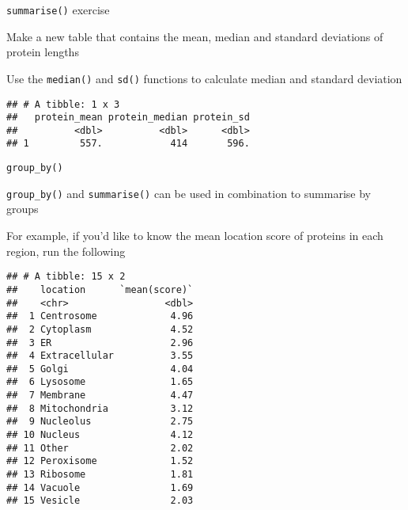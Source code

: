 \documentclass[ignorenonframetext,]{beamer}
\newenvironment{Shaded}{\begin{snugshade}}{\end{snugshade}}
\newcommand{\DataTypeTok}[1]{\textcolor[rgb]{0.13,0.29,0.53}{#1}}
\newcommand{\KeywordTok}[1]{\textcolor[rgb]{0.13,0.29,0.53}{\textbf{#1}}}
\newcommand{\NormalTok}[1]{#1}
\newcommand{\OperatorTok}[1]{\textcolor[rgb]{0.81,0.36,0.00}{\textbf{#1}}}
\newcommand{\StringTok}[1]{\textcolor[rgb]{0.31,0.60,0.02}{#1}}
\begin{document}
\begin{frame}[fragile]{\texttt{summarise()} exercise}
\protect\hypertarget{summarise-exercise}{}

Make a new table that contains the mean, median and standard deviations
of protein lengths

Use the \texttt{median()} and \texttt{sd()} functions to calculate
median and standard deviation

\begin{Shaded}
\end{Shaded}

\begin{verbatim}
## # A tibble: 1 x 3
##   protein_mean protein_median protein_sd
##          <dbl>          <dbl>      <dbl>
## 1         557.            414       596.
\end{verbatim}

\end{frame}

\begin{frame}[fragile]{\texttt{group\_by()}}
\protect\hypertarget{group_by}{}

\texttt{group\_by()} and \texttt{summarise()} can be used in combination
to summarise by groups

For example, if you'd like to know the mean location score of proteins
in each region, run the following

\begin{Shaded}
\end{Shaded}

\begin{verbatim}
## # A tibble: 15 x 2
##    location      `mean(score)`
##    <chr>                 <dbl>
##  1 Centrosome             4.96
##  2 Cytoplasm              4.52
##  3 ER                     2.96
##  4 Extracellular          3.55
##  5 Golgi                  4.04
##  6 Lysosome               1.65
##  7 Membrane               4.47
##  8 Mitochondria           3.12
##  9 Nucleolus              2.75
## 10 Nucleus                4.12
## 11 Other                  2.02
## 12 Peroxisome             1.52
## 13 Ribosome               1.81
## 14 Vacuole                1.69
## 15 Vesicle                2.03
\end{verbatim}

\end{frame}
\end{document}
